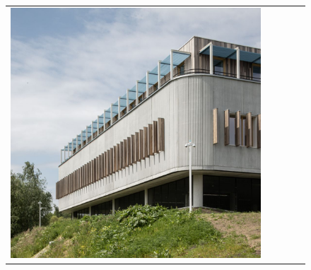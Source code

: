 \begin{figure}[H]
{\begin{tabular}{@{}ccccc@{}}
      \includegraphics[width=\linewidth]{Images/LoRAs/Ghoek/Training_images/10.JPG} \\[2pt]


\end{tabular}}
\end{figure}
